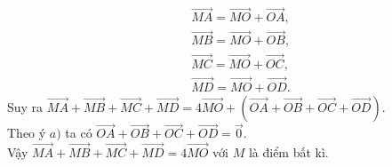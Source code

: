 \begin{vd}
{\begin{enumerate}
			\allowdisplaybreaks
			\begin{eqnarray*}
				&& \overrightarrow{MA}= \overrightarrow {MO}  +  \overrightarrow{OA}, \\ 
				&& \overrightarrow{MB}= \overrightarrow {MO}  +  \overrightarrow{OB}, \\ 
				&& \overrightarrow{MC}= \overrightarrow {MO}  +  \overrightarrow{OC}, \\ 
				&& \overrightarrow{MD}= \overrightarrow {MO}  +  \overrightarrow{OD}. 
			\end{eqnarray*} 
			Suy ra $ \overrightarrow {MA}  +  \overrightarrow{MB}  +  \overrightarrow{MC}  +  \overrightarrow{MD}=4 \overrightarrow {MO}  +  \left( \overrightarrow {OA}  +  \overrightarrow{OB}  +  \overrightarrow{OC}  +  \overrightarrow{OD}\right)$. \\
			Theo ý $a)$ ta có $ \overrightarrow {OA}  +  \overrightarrow{OB}  +  \overrightarrow{OC}  +  \overrightarrow{OD}= \overrightarrow {0}$.\\
			Vậy $ \overrightarrow {MA}  +  \overrightarrow{MB}  +  \overrightarrow{MC}  +  \overrightarrow{MD}=4 \overrightarrow {MO}$ với $M$ là điểm bất kì.
		\end{enumerate}
	}
\end{vd}
